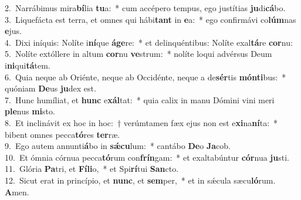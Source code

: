{2.~}Narrábimus mira\textbf{bí}lia \textbf{tu}a:~* cum accépero tempus, ego justítias \textbf{ju}di\textbf{cá}bo.\\
{3.~}Liquefácta est terra, et omnes qui hábi\textbf{tant} in \textbf{e}a:~* ego confirmávi co\textbf{lúm}nas \textbf{e}jus.\\
{4.~}Dixi iníquis: Nolíte i\textbf{ní}que \textbf{á}\textbf{ge}re:~* et delinquéntibus: Nolíte exal\textbf{tá}re \textbf{cor}nu:\\
{5.~}Nolíte extóllere in altum \textbf{cor}nu \textbf{ve}strum:~* nolíte loqui advérsus Deum i\textbf{ni}qui\textbf{tá}tem.\\
{6.~}Quia neque ab Oriénte, neque ab Occidénte, neque a de\textbf{sér}tis \textbf{món}\textbf{ti}bus:~* quóniam \textbf{De}us \textbf{ju}dex est.\\
{7.~}Hunc humíliat, et \textbf{hunc} e\textbf{xál}tat:~* quia calix in manu Dómini vini meri \textbf{ple}nus \textbf{mi}sto.\\
{8.~}Et inclinávit ex hoc in hoc:~† verúmtamen fæx ejus non est e\textbf{xi}na\textbf{ní}ta:~* bibent omnes pecca\textbf{tó}res \textbf{ter}ræ.\\
{9.~}Ego autem annunti\textbf{á}bo in \textbf{sǽ}\textbf{cu}lum:~* cantábo \textbf{De}o \textbf{Ja}cob.\\
{10.~}Et ómnia córnua pecca\textbf{tó}rum con\textbf{frín}gam:~* et exaltabúntur \textbf{cór}nua \textbf{ju}sti.\\
{11.~}Glória \textbf{Pa}tri, et \textbf{Fí}\textbf{li}o,~* et Spi\textbf{rí}tui \textbf{San}cto.\\
{12.~}Sicut erat in princípio, et \textbf{nunc}, et \textbf{sem}per,~* et in sǽcula sæcu\textbf{ló}rum. \textbf{A}men.\\
